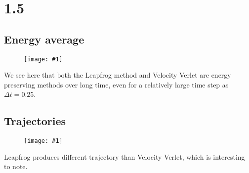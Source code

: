 \documentclass[11pt]{article}
\newcommand{\singlefigure}[1]{
\begin{figure}[H]
  \centering
  \begin{minipage}{0.4\textwidth}
    \centering
    \texttt{[image: \#1]}
  \end{minipage}
\end{figure}
}
\begin{document}
\pagebreak
\section*{1.5}
\begin{multicols}{2}
  \subsection*{Energy average}
  \singlefigure{./plots/1_5/study.png}
  We see here that both the Leapfrog method and Velocity Verlet are energy preserving methods over long time, even for a relatively large time step as $\Delta t = 0.25$.
  \columnbreak
  \subsection*{Trajectories}
  \singlefigure{./plots/1_5/study2.png}
  Leapfrog produces different trajectory than Velocity Verlet, which is interesting to note.
\end{multicols}

\end{document}
